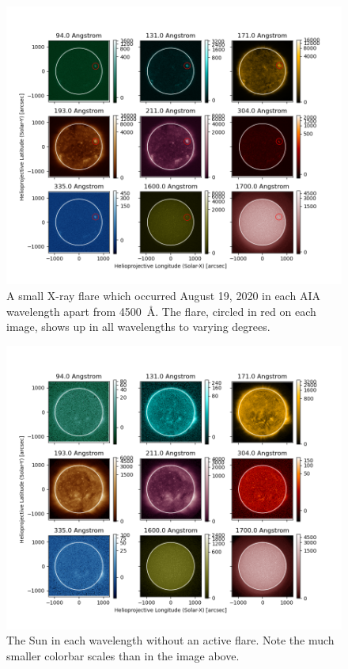 \documentclass[12pt, letterpaper]{article}
\begin{document}
\begin{figure}[ht]
	\includegraphics[width=\textwidth]{figures/0819_flare_labeled.png}
	\centering
	\caption{A small X-ray flare which occurred August 19, 2020 in each AIA wavelength apart from 4500~\AA{}. The flare, circled in red on each image, shows up in all wavelengths to varying degrees.}
	\label{flare}
\end{figure}

\begin{figure}[ht]
	\includegraphics[width=\textwidth]{figures/noflare.png}
	\centering
	\caption{The Sun in each wavelength without an active flare. Note the much smaller colorbar scales than in the image above.}
	\label{noflare}
\end{figure}
\end{document}
